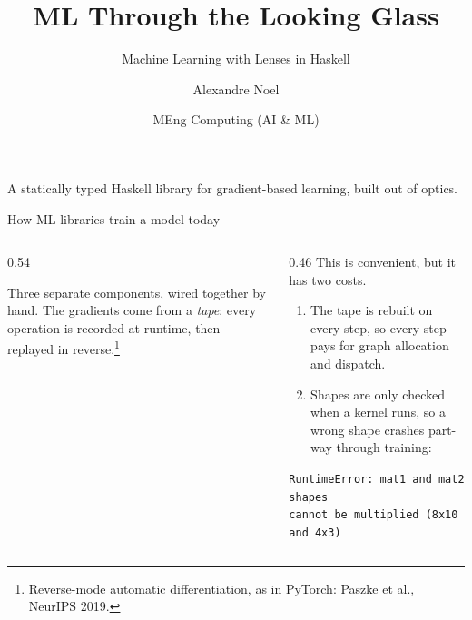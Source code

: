 \documentclass[aspectratio=169,11pt]{beamer}
\title{ML Through the Looking Glass}
\subtitle{Machine Learning with Lenses in Haskell}
\author{Alexandre Noel}
\institute{Imperial College London \quad\textbar\quad Supervisor: Prof.\ Nicolas Wu}
\date{MEng Computing (AI \& ML)}
\begin{document}
\begin{frame}[plain]
  \titlepage
  \begin{center}
    \footnotesize\color{imperialblue}
    A statically typed Haskell library for gradient-based learning, built out of optics.
  \end{center}
\end{frame}


\begin{frame}{How ML libraries train a model today}
  \begin{columns}[T]
    \begin{column}{0.54\textwidth}
      \centering

      \vspace{1em}
      \footnotesize
      Three separate components, wired together by hand. The gradients come from a
      \emph{tape}: every operation is recorded at runtime, then replayed in reverse.\footnote[frame]{Reverse-mode automatic differentiation, as in PyTorch: Paszke et al., NeurIPS 2019.}
    \end{column}
    \begin{column}{0.46\textwidth}
      \small This is convenient, but it has two costs.
      \begin{enumerate}\small\setlength\itemsep{0.4em}
        \item The tape is rebuilt on every step, so every step pays for graph allocation
              and dispatch.
        \item Shapes are only checked when a kernel runs, so a wrong shape crashes
              part-way through training:
      \end{enumerate}
      \vspace{0.4em}
      {\scriptsize\color{accent}
      \texttt{RuntimeError: mat1 and mat2 shapes}\\
      \texttt{cannot be multiplied (8x10 and 4x3)}}
    \end{column}
  \end{columns}
\end{frame}
\end{document}
